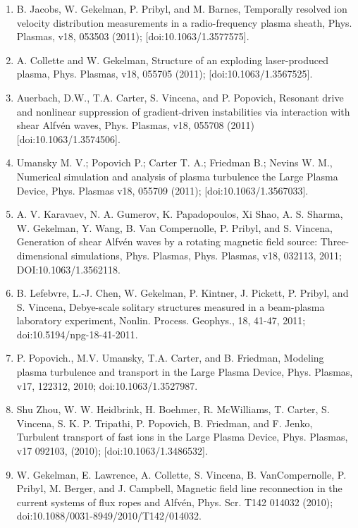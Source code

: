 \documentclass[11pt]{article}
\begin{document}
\begin{enumerate}
\item  B. Jacobs, W. Gekelman, P. Pribyl, and M. Barnes, Temporally resolved ion velocity distribution measurements in a radio-frequency plasma sheath, Phys. Plasmas, v18, 053503 (2011); [doi:10.1063/1.3577575].

\item  A. Collette and W. Gekelman, Structure of an exploding laser-produced plasma, Phys. Plasmas, v18, 055705 (2011); [doi:10.1063/1.3567525].

\item   Auerbach, D.W., T.A. Carter, S. Vincena, and P. Popovich, Resonant drive and nonlinear suppression of gradient-driven instabilities via interaction with shear Alfv\'{e}n waves, Phys. Plasmas, v18, 055708 (2011) [doi:10.1063/1.3574506].

\item Umansky M. V.; Popovich P.; Carter T. A.; Friedman B.; Nevins W. M., Numerical simulation and analysis of plasma turbulence the Large Plasma Device, Phys. Plasmas v18, 055709 (2011); [doi:10.1063/1.3567033].

\item  A. V. Karavaev, N. A. Gumerov, K. Papadopoulos, Xi Shao, A. S. Sharma, W. Gekelman, Y. Wang, B. Van Compernolle, P. Pribyl, and S. Vincena, Generation of shear Alfv\'{e}n waves by a rotating magnetic field source: Three-dimensional simulations, Phys. Plasmas, Phys. Plasmas, v18, 032113, 2011; DOI:10.1063/1.3562118.

\item  B. Lefebvre, L.-J. Chen, W. Gekelman, P. Kintner, J. Pickett, P. Pribyl, and S. Vincena, Debye-scale solitary structures measured in a beam-plasma laboratory experiment, Nonlin. Process. Geophys., 18, 41-47, 2011; doi:10.5194/npg-18-41-2011.

\item   P. Popovich., M.V. Umansky, T.A. Carter, and B. Friedman, Modeling plasma turbulence and transport in the Large Plasma Device, Phys. Plasmas, v17, 122312, 2010; doi:10.1063/1.3527987.

\item Shu Zhou, W. W. Heidbrink, H. Boehmer, R. McWilliams, T. Carter, S. Vincena, S. K. P. Tripathi, P. Popovich, B. Friedman, and F. Jenko, Turbulent transport of fast ions in the Large Plasma Device, Phys. Plasmas, v17 092103, (2010); [doi:10.1063/1.3486532].

\item  W. Gekelman, E. Lawrence, A. Collette, S. Vincena, B. VanCompernolle, P. Pribyl, M. Berger, and J. Campbell, Magnetic field line reconnection in the current systems of flux ropes and Alfv\'{e}n, Phys. Scr. T142 014032 (2010); doi:10.1088/0031-8949/2010/T142/014032.


\end{enumerate}
\end{document}
